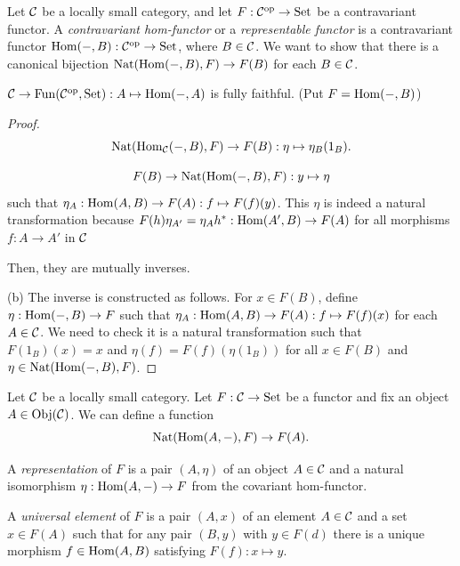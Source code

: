 \documentclass{../../large}
\begin{document}
\begin{prb}
Let $\mathcal{C}$ be a locally small category, and let $F:\mathcal{C}^{\mathrm{op}}\to\operatorname{Set}$ be a contravariant functor.
A \emph{contravariant hom-functor} or a \emph{representable functor} is a contravariant functor $\operatorname{Hom}(-,B):\mathcal{C}^{\mathrm{op}}\to\operatorname{Set}$, where $B\in\mathcal{C}$.
We want to show that there is a canonical bijection $\operatorname{Nat}(\operatorname{Hom}(-,B),F)\to F(B)$ for each $B\in\mathcal{C}$.

\begin{parts}
\item 
\item $\mathcal{C}\to\operatorname{Fun}(\mathcal{C}^{\mathrm{op}},\operatorname{Set}):A\mapsto\operatorname{Hom}(-,A)$ is fully faithful. (Put $F=\operatorname{Hom}(-,B)$)
\end{parts}
\end{prb}
\begin{proof}

\[\operatorname{Nat}(\operatorname{Hom}_{\mathcal{C}}(-,B),F)\to F(B):\eta\mapsto\eta_B(1_B).\]

\[F(B)\to\operatorname{Nat}(\operatorname{Hom}(-,B),F):y\mapsto\eta\]
such that $\eta_A:\operatorname{Hom}(A,B)\to F(A):f\mapsto F(f)(y)$.
This $\eta$ is indeed a natural transformation because $F(h)\eta_{A'}=\eta_Ah^*:\operatorname{Hom}(A',B)\to F(A)$ for all morphisms $f:A\to A'$ in $\mathcal{C}$

Then, they are mutually inverses.


(b)
The inverse is constructed as follows.
For $x\in F(B)$, define $\eta:\operatorname{Hom}(-,B)\to F$ such that $\eta_A:\operatorname{Hom}(A,B)\to F(A):f\mapsto F(f)(x)$ for each $A\in\mathcal{C}$.
We need to check it is a natural transformation such that $F(1_B)(x)=x$ and $\eta(f)=F(f)(\eta(1_B))$ for all $x\in F(B)$ and $\eta\in\operatorname{Nat}(\operatorname{Hom}(-,B),F)$.
\end{proof}

\begin{prb}
Let $\mathcal{C}$ be a locally small category.
Let $F:\mathcal{C}\to\operatorname{Set}$ be a functor and fix an object $A\in\operatorname{Obj}(\mathcal{C})$.
We can define a function
\[\operatorname{Nat}(\operatorname{Hom}(A,-),F)\to F(A).\]

A \emph{representation} of $F$ is a pair $(A,\eta)$ of an object $A\in\mathcal{C}$ and a natural isomorphism $\eta:\operatorname{Hom}(A,-)\to F$ from the covariant hom-functor.

A \emph{universal element} of $F$ is a pair $(A,x)$ of an element $A\in\mathcal{C}$ and a set $x\in F(A)$ such that for any pair $(B,y)$ with $y\in F(d)$ there is a unique morphism $f\in\operatorname{Hom}(A,B)$ satisfying $F(f):x\mapsto y$.

\begin{parts}
\item
\end{parts}
\end{prb}
\end{document}
